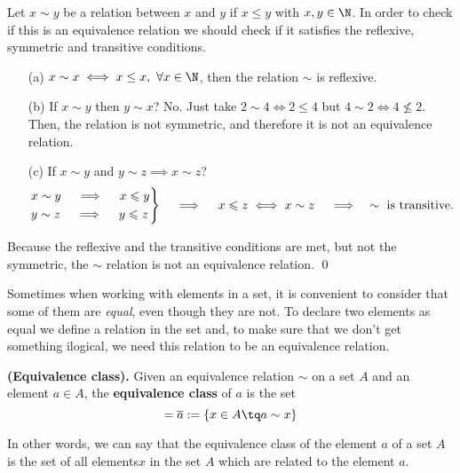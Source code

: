 \begin{example}
    Let $x\sim y$ be a relation between $x$ and $y$ if $x\leq y$ with $x, y\in\N$. In order to check if this is an equivalence relation we should check if it satisfies the reflexive, symmetric and transitive conditions.

    \begin{itemize}
        \item[(a)] $x\sim x \iff x\leq x,\ \forall x\in\N$, then the relation $\sim$ is reflexive.
        \item[(b)] If $x\sim y$ then $y\sim x$? No. Just take $2\sim 4 \iff 2\leqslant 4$ but $4\sim 2 \iff 4\nleqslant 2$. Then, the relation is not symmetric, and therefore it is not an equivalence relation.
        \item[(c)] If $x\sim y$ and $y\sim z \implies x\sim z$?
            \begin{equation}
                \begin{rcases}
                    x\sim y \quad\implies\quad x\leqslant y \\
                    y\sim z \quad\implies\quad y\leqslant z
                \end{rcases} \quad\implies\quad x\leqslant z \iff x\sim z\quad\implies\quad\sim\textrm{ is transitive.}
            \end{equation}
    \end{itemize}
    Because the reflexive and the transitive conditions are met, but not the symmetric, the $\sim$ relation is not an equivalence relation.
    \qed
\end{example}

Sometimes when working with elements in a set, it is convenient to consider that some of them are \textit{equal}, even though they are not. To declare two elements as equal we define a relation in the set and, to make sure that we don't get something ilogical, we need this relation to be an equivalence relation.

\begin{definition}
\textbf{(Equivalence class).} Given an equivalence relation $\sim$ on a set $A$ and an element $a\in A$, the \textbf{equivalence class} of $a$ is the set
    \begin{equation}
        [a] = \overline{a} := \{x\in A \tq a\sim x\} 
    \end{equation}
\end{definition}

In other words, we can say that the equivalence class of the element $a$ of a set $A$ is the set of all elements$x$ in the set $A$ which are related to the element $a$.


